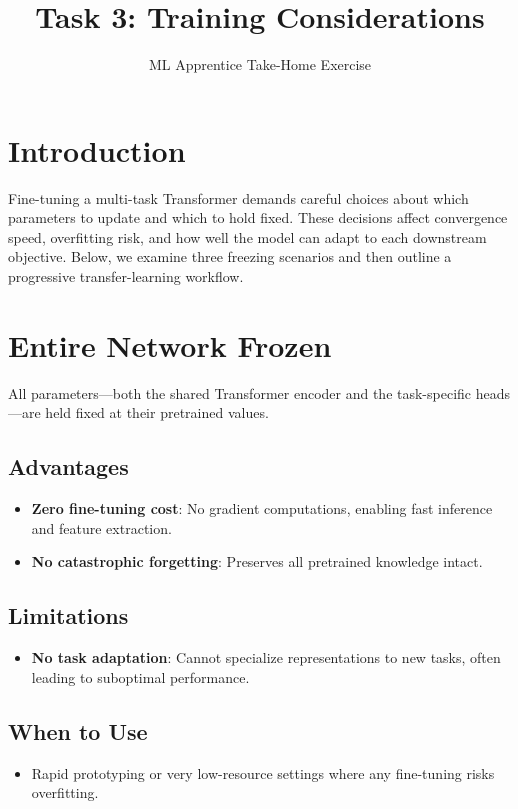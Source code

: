 \documentclass{article}
\title{Task 3: Training Considerations}
\author{ML Apprentice Take-Home Exercise}
\date{}
\begin{document}
\maketitle

\section*{Introduction}
Fine-tuning a multi-task Transformer demands careful choices about which parameters to update and which to hold fixed. These decisions affect convergence speed, overfitting risk, and how well the model can adapt to each downstream objective. Below, we examine three freezing scenarios and then outline a progressive transfer-learning workflow.

\section{Entire Network Frozen}
All parameters---both the shared Transformer encoder and the task-specific heads---are held fixed at their pretrained values.

\subsection*{Advantages}
\begin{itemize}
  \item \textbf{Zero fine-tuning cost}: No gradient computations, enabling fast inference and feature extraction.
  \item \textbf{No catastrophic forgetting}: Preserves all pretrained knowledge intact.
\end{itemize}

\subsection*{Limitations}
\begin{itemize}
  \item \textbf{No task adaptation}: Cannot specialize representations to new tasks, often leading to suboptimal performance.
\end{itemize}

\subsection*{When to Use}
\begin{itemize}
  \item Rapid prototyping or very low-resource settings where any fine-tuning risks overfitting.
\end{itemize}
\end{document}
